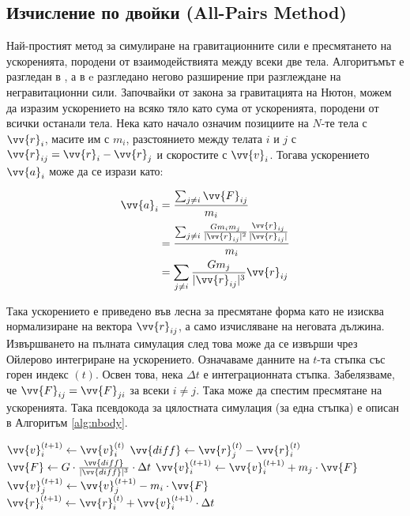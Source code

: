 \documentclass[11pt, a4paper]{article}
\begin{document}
\begin{sloppypar}
\subsection{Изчисление по двойки (All-Pairs Method)}

Най-простият метод за симулиране на гравитационните сили е пресмятането на ускоренията, породени от взаимодействията между всеки две тела. Алгоритъмът е разгледан в \cite{burtscher2011efficient,nylons2007fast,Grimm_2022}, а в \cite{spurzem1999direct} e разгледано негово разширение при разглеждане на негравитационни сили. Започвайки от закона за гравитацията на Нютон, можем да изразим ускорението на всяко тяло като сума от ускоренията, породени от всички останали тела. Нека като начало означим позициите на $N$-те тела с $\vv{r}_i$, масите им с $m_i$, разстоянието между телата $i$ и $j$ с $\vv{r}_{ij} = \vv{r}_i - \vv{r}_j$ и скоростите с $\vv{v}_i$. Тогава ускорението $\vv{a}_i$ може да се изрази като:

\begin{equation}
\begin{aligned}
\vv{a}_i &= \frac{\sum_{j \neq i} \vv{F}_{ij}}{m_i} \\
		  &= \frac{\sum_{j \neq i} \frac{G m_i m_j}{|\vv{r}_{ij}|^2} \frac{\vv{r}_{ij}}{|\vv{r}_{ij}|}}{m_i} \\
		  &= \sum_{j \neq i} \frac{G m_j}{|\vv{r}_{ij}|^3} \vv{r}_{ij}
\end{aligned}
\end{equation}

Така ускорението е приведено във лесна за пресмятане форма като не изисква нормализиране на вектора $\vv{r}_{ij}$, а само изчисляване на неговата дължина. Извършването на пълната симулация след това може да се извърши чрез Ойлерово интегриране на ускорението. Означаваме данните на $t$-та стъпка със горен индекс $(t)$. Освен това, нека $\Delta t$ е интеграционната стъпка. Забелязваме, че $\vv{F}_{ij} = \vv{F}_{ji}$ за всеки $i \neq j$. Така може да спестим пресмятане на ускоренията. Така псевдокода за цялостната симулация (за една стъпка) е описан в Алгоритъм \ref{alg:nbody}.

\begin{algorithm}
\caption{N-Body симулация по двойки обекти}
\label{alg:nbody}
\begin{algorithmic}[1]
	\State $\vv{v}_i^{(t+1)} \gets \vv{v}_i^{(t)}$
		\State $\vv{diff} \gets \vv{r}_j^{(t)} - \vv{r}_i^{(t)}$
		\State $\vv{F} \gets G \cdot \frac{\vv{diff}}{|\vv{diff}|^3} \cdot \Delta t$
		\State $\vv{v}_i^{(t+1)} \gets \vv{v}_i^{(t+1)} + m_j \cdot \vv{F}$
		\State $\vv{v}_j^{(t+1)} \gets \vv{v}_j^{(t+1)} - m_i \cdot \vv{F}$
	\EndFor
\EndFor
{}
	\State $\vv{r}_i^{(t+1)} \gets \vv{r}_i^{(t)} + \vv{v}_i^{(t+1)} \cdot \Delta t$
\EndFor
\end{algorithmic}
\end{algorithm}


\end{sloppypar}
\end{document}
